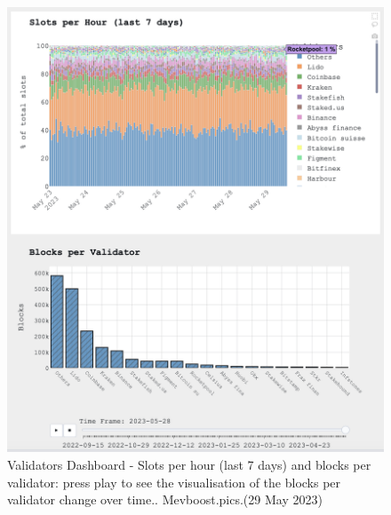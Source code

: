 \documentclass[UTF8]{article}
\begin{document}
\begin{figure}[htbp]
\begin{center}
\includegraphics[width=0.9\linewidth]{images/mevvalidator2}
\caption{Validators Dashboard - Slots per hour (last 7 days) and blocks per validator: press play to see the visualisation of the blocks per validator change over time.. Mevboost.pics.(29 May 2023)}
\label{fig:mevvalidator2}
\end{center}
\end{figure}
\end{document}
